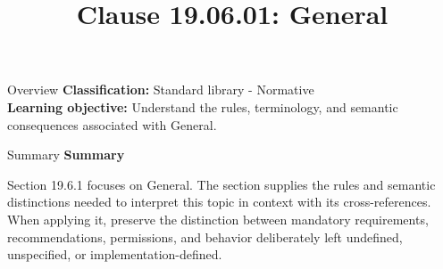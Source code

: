 \documentclass[10pt,letterpaper]{article}
\title{Clause 19.06.01: General}
\author{}
\date{}
\begin{document}
\maketitle
\begin{CornellOverviewBox}{Overview}
\textbf{Classification:} Standard library - Normative\\[2pt]
\textbf{Learning objective:} Understand the rules, terminology, and semantic consequences associated with General.
\end{CornellOverviewBox}\begin{CornellSummaryBox}{Summary}
{\sffamily\bfseries\color{Accent} Summary}\par\vspace{3pt}Section 19.6.1 focuses on General. The section supplies the rules and semantic distinctions needed to interpret this topic in context with its cross-references. When applying it, preserve the distinction between mandatory requirements, recommendations, permissions, and behavior deliberately left undefined, unspecified, or implementation-defined.
\end{CornellSummaryBox}
\end{document}
